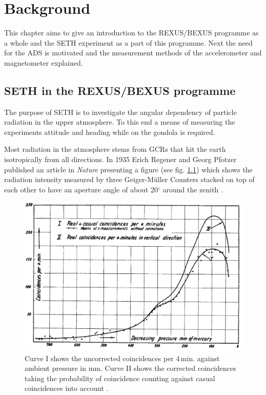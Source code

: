 \chapter{Background \label{ch:background}}
This chapter aims to give an introduction to the \acf{REXUS}/\acf{BEXUS} programme as a whole and the \acf{SETH} experiment as a part of this programme. Next the need for the \acf{ADS} is motivated and the measurement methods of the accelerometer and magnetometer explained.

\section{\acs{SETH} in the \acs{REXUS/BEXUS} programme \label{sec:bg:seth_and_bx_programme}}

The purpose of \ac{SETH} is to investigate the angular dependency of particle radiation in the upper atmosphere. To this end a means of measuring the experiments attitude and heading while on the gondola is required.

Most radiation in the atmosphere stems from \acp{GCR} that hit the earth isotropically from all directions. In 1935 Erich Regener and Georg Pfotzer published an article in \textit{Nature} presenting a figure (see fig. \ref{fig:regener1935}) which shows the radiation intensity measured by three Geiger-Müller Counters stacked on top of each other to have an aperture angle of about 20$^\circ$ around the zenith \parencite{regener-pfotzer-1935}.

\begin{figure}[H]
    \centering
    \includegraphics[width=0.8\linewidth]{images/01_background/original_regener_pfotzer.png}
    \caption[Regener-Pfotzer-Maximum as shown in \parencite{regener-pfotzer-1935}]{Curve I shows the uncorrected coincidences per 4\,min. against ambient pressure in mm. Curve II shows the corrected coincidences taking the probability of coincidence counting against casual coincidences into account \parencite{regener-pfotzer-1935}.}
    \label{fig:regener1935}
\end{figure}

